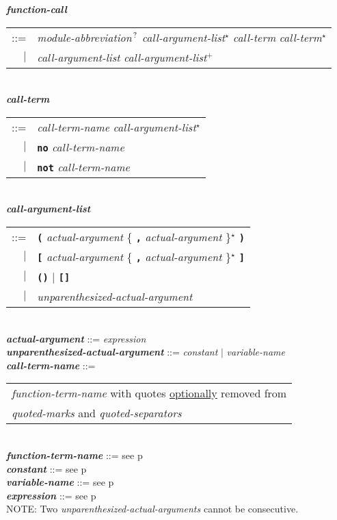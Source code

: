 \documentclass[12pt]{article}
\newcommand{\TT}[1]{{\tt \bfseries #1}}
\newcommand{\STAR}{{\Large $^\star$}}
\newcommand{\PLUS}[1][]{{$^{+#1}$}}
\newcommand{\QMARK}{{$^{\,\mbox{\footnotesize ?}}$}}
\newcommand{\ttkey}[1]{{\tt \bfseries #1}}
\newcommand{\emkey}[1]{{\em \bfseries #1}}
\newcommand{\pagref}[1]{p\pageref{#1}}
\newenvironment{indpar}[1][0.3in]%
	{\begin{list}{}%
		     {\setlength{\itemsep}{0in}%
		      \setlength{\topsep}{0in}%
		      \setlength{\parsep}{1ex}%
		      \setlength{\labelwidth}{#1}%
		      \setlength{\leftmargin}{#1}%
		      \addtolength{\leftmargin}{\labelsep}}%
	 \item}%
	{\end{list}}
\begin{document}
\begin{indpar}
\emkey{function-call}\label{FUNCTION-CALL}
    \begin{tabular}[t]{rl}
    ::= & {\em module-abbreviation}\QMARK{}
          {\em call-argument-list}\STAR{}
          {\em call-term} {\em call-term}\STAR{} \\
    $|$ & {\em call-argument-list}
          {\em call-argument-list}\PLUS{} \\
    \end{tabular}
\\[0.5ex]
\emkey{call-term}
    \begin{tabular}[t]{rl}
    ::= & {\em call-term-name} {\em call-argument-list}\STAR{} \\
    $|$ & \ttkey{no} {\em call-term-name} \\
    $|$ & \ttkey{not} {\em call-term-name} \\
    \end{tabular}
\\[0.5ex]
\emkey{call-argument-list}\label{CALL-ARGUMENT-LIST}
    \begin{tabular}[t]{rl}
    ::= & \TT{(} {\em actual-argument}
          \{ \TT{,} {\em actual-argument} \}\STAR{} \TT{)} \\
    $|$ & \TT{[} {\em actual-argument}
          \{ \TT{,} {\em actual-argument} \}\STAR{} \TT{]} \\
    $|$ & \TT{()} $|$ \TT{[]} \\
    $|$ & {\em unparenthesized-actual-argument} \\
    \end{tabular}
\\[0.5ex]
\emkey{actual-argument} ::= {\em expression}
\\[0.5ex]
\emkey{unparenthesized-actual-argument} ::=
    {\em constant} $|$ {\em variable-name}
\\[0.5ex]
\emkey{call-term-name}\label{CALL-TERM-NAME} ::=
    \begin{tabular}[t]{@{}l}
    {\em function-term-name} with quotes \underline{optionally} removed from \\
    {\em quoted-marks} and {\em quoted-separators}
    \end{tabular}
\\[0.5ex]
\emkey{function-term-name} ::= see \pagref{FUNCTION-TERM-NAME}
\\[0.5ex]
\emkey{constant} ::= see \pagref{CONSTANTS}
\\[0.5ex]
\emkey{variable-name} ::= see \pagref{VARIABLE-NAME}
\\[0.5ex]
\emkey{expression} ::= see \pagref{EXPRESSION}
\\[2.0ex]
NOTE: Two {\em unparenthesized-actual-arguments} cannot be consecutive.
\end{indpar}
\end{document}
